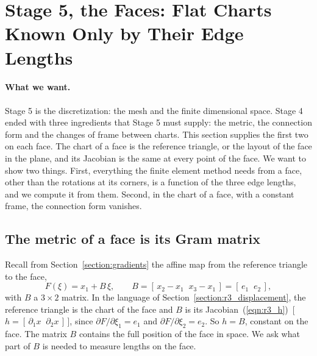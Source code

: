 \section{Stage 5, the Faces: Flat Charts Known Only by Their Edge Lengths}
\label{section:int_triangle}

\paragraph{What we want.} Stage 5 is the discretization: the mesh and the finite dimensional space. Stage 4 ended with three ingredients that Stage 5 must supply: the metric, the connection form and the changes of frame between charts. This section supplies the first two on each face. The chart of a face is the reference triangle, or the layout of the face in the plane, and its Jacobian is the same at every point of the face. We want to show two things. First, everything the finite element method needs from a face, other than the rotations at its corners, is a function of the three edge lengths, and we compute it from them. Second, in the chart of a face, with a constant frame, the connection form vanishes.

\subsection{The metric of a face is its Gram matrix}

Recall from Section~\ref{section:gradients} the affine map from the reference triangle to the face,
\begin{equation*}
F(\xi) = x_1 + B\, \xi, \qquad B = [\,x_2 - x_1 \;\; x_3 - x_1\,] = [\,e_1 \;\; e_2\,],
\end{equation*}
with $B$ a $3 \times 2$ matrix. In the language of Section~\ref{section:r3_displacement}, the reference triangle is the chart of the face and $B$ is its Jacobian~(\ref{eqn:r3_h})~[\,$h = [\,\partial_1x \;\; \partial_2x\,]$\,], since $\partial F/\partial\xi_1 = e_1$ and $\partial F/\partial\xi_2 = e_2$. So $h = B$, constant on the face. The matrix $B$ contains the full position of the face in space. We ask what part of $B$ is needed to measure lengths on the face.

